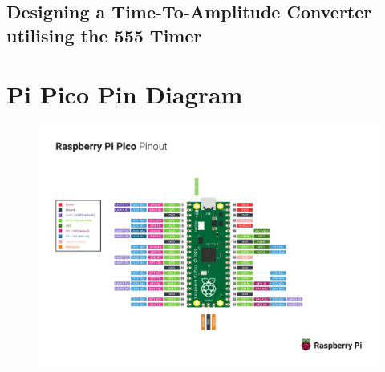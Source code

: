 \documentclass[%
 reprint,
 amsmath,amssymb,
 aps,
]{revtex4-2}
\begin{document}
    \subsection{Designing a Time-To-Amplitude Converter utilising the 555 Timer}


\clearpage


\clearpage
\onecolumngrid
\appendix

\section{Pi Pico Pin Diagram}

    \begin{figure}[h]
        \includegraphics[width=\columnwidth]{Images/Pico-R3-A4-Pinout.pdf}
    \end{figure}
\end{document}

